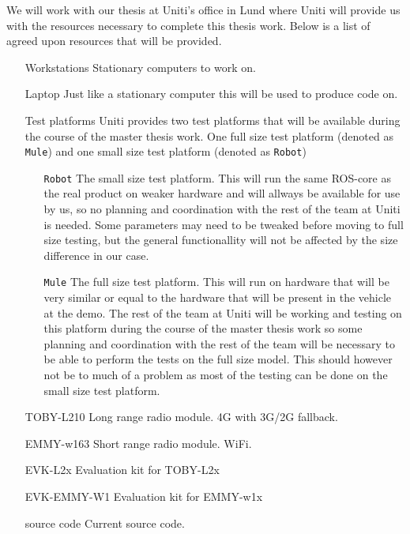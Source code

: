 \documentclass[a4paper]{article}
\begin{document}


We will work with our thesis at Uniti's office in Lund where Uniti will provide
us with the resources necessary to complete this thesis work. Below is a list of
agreed upon resources that will be provided.

\begin{itemize}
	\item[Workstations] Stationary computers to work on.
	\item[Laptop] Just like a stationary computer this will be used to produce
		code on.
	\item[Test platforms] Uniti provides two test platforms that will be available
		during the course of the master thesis work. One full size test platform
		(denoted as \texttt{Mule}) and one small size test platform (denoted as
		\texttt{Robot})
		\begin{itemize}
			\item[\texttt{Robot}] The small size test platform. This will run the same
				ROS-core as the real product on weaker hardware and will allways be
				available for use by us, so no planning and coordination with the rest
				of the team at Uniti is needed. Some parameters may need to be tweaked
				before moving to full size testing, but the general functionallity will
				not be affected by the size difference in our case.
			\item[\texttt{Mule}] The full size test platform. This will run on
				hardware that will be very similar or equal to the hardware that will be
				present in the vehicle at the demo. The rest of the team at Uniti will
				be working and testing on this platform during the course of the master
				thesis work so some planning and coordination with the rest of the team
				will be necessary to be able to perform the tests on the full size
				model. This should however not be to much of a problem as most of the
				testing can be done on the small size test platform.
		\end{itemize}
	\item[TOBY-L210] Long range radio module. 4G with 3G/2G fallback.
	\item[EMMY-w163] Short range radio module. WiFi.
	\item[EVK-L2x] Evaluation kit for TOBY-L2x
	\item[EVK-EMMY-W1] Evaluation kit for EMMY-w1x
	\item[source code] Current source code.

\end{itemize}
\end{document}
